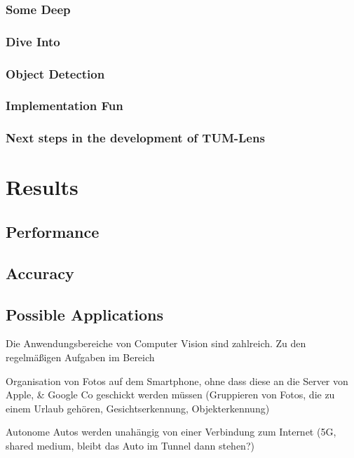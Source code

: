 \documentclass[
			   fontsize=11pt,
               paper=a4,
               bibliography=totoc,
               idxtotoc,
               headsepline,
               footsepline,
               footinclude=false,
               BCOR=12mm,
               DIV=13,
               openany,   %
               ]
               {scrbook}
\begin{document}
\subsection{Some Deep}
\subsection{Dive Into}
\subsection{Object Detection}
\subsection{Implementation Fun}

\subsection{Next steps in the development of TUM-Lens}


\chapter{Results}

\section{Performance}

\section{Accuracy}

\section{Possible Applications} %

Die Anwendungsbereiche von Computer Vision sind zahlreich. Zu den regelmäßigen Aufgaben im Bereich 

Organisation von Fotos auf dem Smartphone, ohne dass diese an die Server von Apple, \& Google Co geschickt werden müssen (Gruppieren von Fotos, die zu einem Urlaub gehören, Gesichtserkennung, Objekterkennung)

Autonome Autos werden unahängig von einer Verbindung zum Internet (5G, shared medium, bleibt das Auto im Tunnel dann stehen?)
\end{document}
